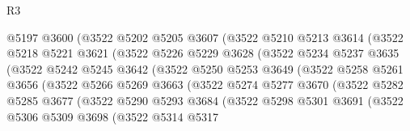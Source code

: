 \begin{lexlean}{R3}
\begin{coremodule}
                      @5197
                      @3600
                      (@3522
                        @5202
                        @5205
                        @3607
                        (@3522
                          @5210
                          @5213
                          @3614
                          (@3522
                            @5218
                            @5221
                            @3621
                            (@3522
                              @5226
                              @5229
                              @3628
                              (@3522
                                @5234
                                @5237
                                @3635
                                (@3522
                                  @5242
                                  @5245
                                  @3642
                                  (@3522
                                    @5250
                                    @5253
                                    @3649
                                    (@3522
                                      @5258
                                      @5261
                                      @3656
                                      (@3522
                                        @5266
                                        @5269
                                        @3663
                                        (@3522
                                          @5274
                                          @5277
                                          @3670
                                          (@3522
                                            @5282
                                            @5285
                                            @3677
                                            (@3522
                                              @5290
                                              @5293
                                              @3684
                                              (@3522
                                                @5298
                                                @5301
                                                @3691
                                                (@3522
                                                  @5306
                                                  @5309
                                                  @3698
                                                  (@3522
                                                    @5314
                                                    @5317

\end{coremodule}
\end{lexlean}
